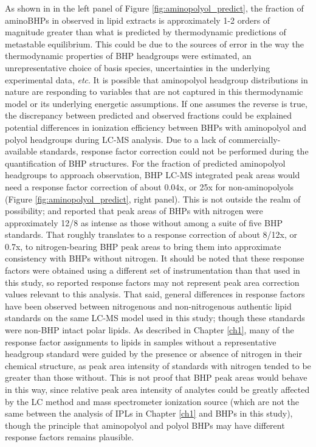 As shown in in the left panel of Figure \ref{fig:aminopolyol_predict}, the fraction of aminoBHPs in observed in lipid extracts is approximately 1-2 orders of magnitude greater than what is predicted by thermodynamic predictions of metastable equilibrium. This could be due to the sources of error in the way the thermodynamic properties of BHP headgroups were estimated, an unrepresentative choice of basis species, uncertainties in the underlying experimental data, \textit{etc}. It is possible that aminopolyol headgroup distributions in nature are responding to variables that are not captured in this thermodynamic model or its underlying energetic assumptions. If one assumes the reverse is true, the discrepancy between predicted and observed fractions could be explained potential differences in ionization efficiency between BHPs with aminopolyol and polyol headgroups during LC-MS analysis. Due to a lack of commercially-available standards, response factor correction could not be performed during the quantification of BHP structures. For the fraction of predicted aminopolyol headgroups to approach observation, BHP LC-MS integrated peak areas would need a response factor correction of about 0.04x, or 25x for non-aminopolyols (Figure \ref{fig:aminopolyol_predict}, right panel). This is not outside the realm of possibility; \cite{cooke2008bacterial} and \cite{van2012bacteriohopanepolyol} reported that  peak areas of BHPs with nitrogen were approximately 12/8 as intense as those without among a suite of five BHP standards. That roughly translates to a response correction of about 8/12x, or 0.7x, to nitrogen-bearing BHP peak areas to bring them into approximate consistency with BHPs without nitrogen. It should be noted that these response factors were obtained using a different set of instrumentation than that used in this study, so reported response factors may not represent peak area correction values relevant to this analysis. That said, general differences in response factors have been observed between nitrogenous and non-nitrogenous authentic lipid standards on the same LC-MS model used in this study; though these standards were non-BHP intact polar lipids. As described in Chapter \ref{ch1}, many of the response factor assignments to lipids in samples without a representative headgroup standard were guided by the presence or absence of nitrogen in their chemical structure, as peak area intensity of standards with nitrogen tended to be greater than those without. This is not proof that BHP peak areas would behave in this way, since relative peak area intensity of analytes could be greatly affected by the LC method and mass spectrometer ionization source (which are not the same between the analysis of IPLs in Chapter \ref{ch1} and BHPs in this study), though the principle that aminopolyol and polyol BHPs may have different response factors remains plausible.

